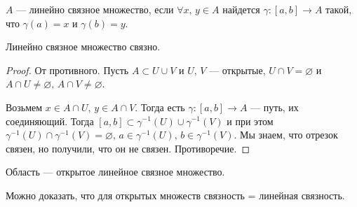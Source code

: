 \begin{conj}
  $A$ --- линейно связное множество, если $\forall x,\, y \in A$ найдется
  $\gamma\colon [a, b] \to A$ такой, что $\gamma(a) = x$ и $\gamma(b) = y$.
\end{conj}

\begin{theorem}
  Линейно связное множество связно.
\end{theorem} \nopagebreak[4]
\begin{proof}
  От противного. Пусть $A \subset U \cup V$ и $U,\, V$ --- открытые, $U \cap V = \varnothing$ и $A \cap U \neq \varnothing, \, A \cap V \neq \varnothing$.

  Возьмем $x \in A \cap U, \, y \in A \cap V$. Тогда есть $\gamma\colon [a, b] \to A$ --- путь, их соединяющий. Тогда $[a, b] \subset \gamma^{-1}(U) \cup \gamma^{-1}(V)$ и при этом~$\gamma^{-1}(U) \cap \gamma^{-1}(V) = \varnothing, \, a \in \gamma^{-1}(U), \, b \in \gamma^{-1}(V)$. Мы знаем, что отрезок связен, но получили, что он не связен. Противоречие.
\end{proof}

\begin{conj}
  Область --- открытое линейное связное множество.
\end{conj}

\begin{notice}
  Можно доказать, что для открытых множеств связность = линейная связность.
\end{notice}
